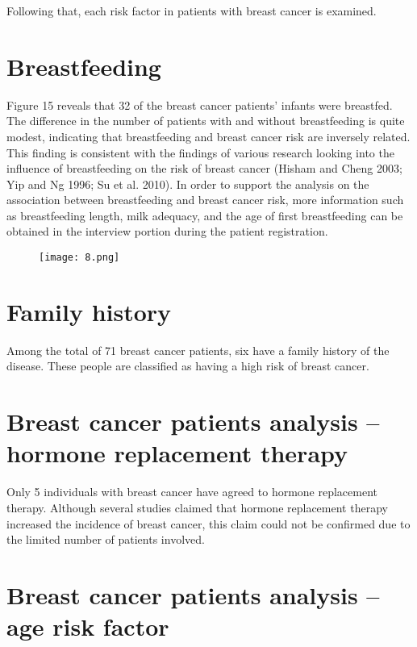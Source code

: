 \documentclass[10pt,a4paper,twoside]{article}
\begin{document}
Following that, each risk factor in patients with breast cancer is examined.

\section{Breastfeeding}

Figure 15 reveals that 32 of the breast cancer patients' infants were breastfed. The difference in the number of patients with and without breastfeeding is quite modest, indicating that breastfeeding and breast cancer risk are inversely related. This finding is consistent with the findings of various research looking into the influence of breastfeeding on the risk of breast cancer (Hisham and Cheng 2003; Yip and Ng 1996; Su et al. 2010). In order to support the analysis on the association between breastfeeding and breast cancer risk, more information such as breastfeeding length, milk adequacy, and the age of first breastfeeding can be obtained in the interview portion during the patient registration.

\begin{figure}
  \texttt{[image: 8.png]}
  
  
  
\end{figure}

\section{Family history}

Among the total of 71 breast cancer patients, six have a family history of the disease. These people are classified as having a high risk of breast cancer.
\section{Breast cancer patients analysis – hormone replacement
therapy}
Only 5 individuals with breast cancer have agreed to hormone replacement therapy. Although several studies claimed that hormone replacement therapy increased the incidence of breast cancer, this claim could not be confirmed due to the limited number of patients involved.



\section{Breast cancer patients analysis – age risk factor}
\end{document}
